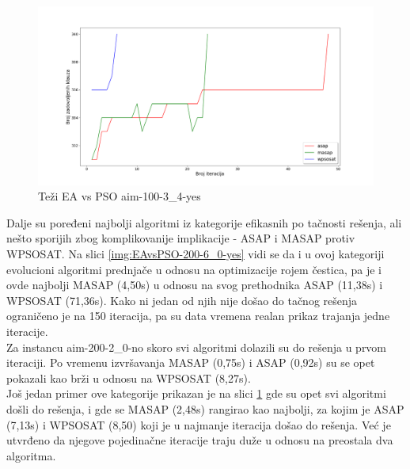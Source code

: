 \documentclass[a4paper]{article}
\begin{document}
\begin{figure}[h!]
\centering
\includegraphics[width=\textwidth]{ea-pso-aim-100-3_4-yes.png}
\caption{Teži EA vs PSO aim-100-3\_4-yes}\label{img:EAvsPSO-100-3_4-yes}
\end{figure}

Dalje su poređeni najbolji algoritmi iz kategorije efikasnih po tačnosti rešenja,
ali nešto sporijih zbog komplikovanije implikacije - ASAP i MASAP protiv WPSOSAT.
Na slici \ref{img:EAvsPSO-200-6_0-yes} vidi se da i u ovoj kategoriji evolucioni algoritmi 
prednjače u odnosu na optimizacije rojem čestica,
pa je i ovde najbolji MASAP (4,50s) u odnosu na svog prethodnika ASAP (11,38s) i
WPSOSAT (71,36s). Kako ni jedan od njih nije došao do tačnog rešenja ograničeno je na 
150 iteracija, pa su data vremena realan prikaz trajanja jedne iteracije. \\

Za instancu aim-200-2\_0-no skoro svi algoritmi dolazili su do rešenja u prvom iteraciji.
Po vremenu izvršavanja MASAP (0,75s) i ASAP (0,92s) su se opet pokazali kao brži
u odnosu na WPSOSAT (8,27s).\\

Još jedan primer ove kategorije prikazan je na slici \ref{img:EAvsPSO-100-3_4-yes}
gde su opet svi algoritmi došli do rešenja, i gde se MASAP (2,48s) rangirao kao najbolji,
za kojim je ASAP (7,13s) i WPSOSAT (8,50) koji je u najmanje iteracija došao do rešenja.
Već je utvrđeno da njegove pojedinačne iteracije traju duže u odnosu na preostala dva
algoritma.
\end{document}
